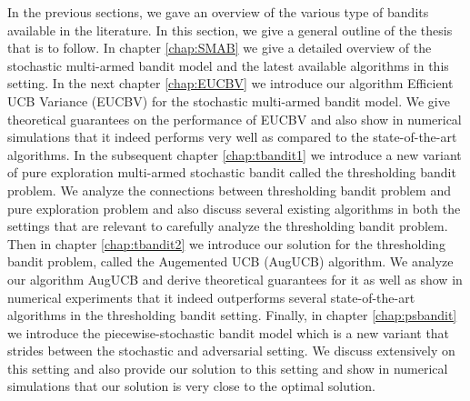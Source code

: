 In the previous sections, we gave an overview of the various type of bandits available in the literature. In this section, we give a general outline of the thesis that is to follow. In chapter \ref{chap:SMAB} we give a detailed overview of the stochastic multi-armed bandit model and the latest available algorithms in this setting. In the next chapter \ref{chap:EUCBV} we introduce our algorithm Efficient UCB Variance (EUCBV) for the stochastic multi-armed bandit model. We give theoretical guarantees on the performance of EUCBV and also show in numerical simulations that it indeed performs very well as compared to the state-of-the-art algorithms. In the subsequent chapter \ref{chap:tbandit1} we introduce a new variant of pure exploration multi-armed stochastic bandit called the thresholding bandit problem. We analyze the connections between thresholding bandit problem and pure exploration problem and also discuss several existing algorithms in both the settings that are relevant to carefully analyze the thresholding bandit problem. Then in chapter \ref{chap:tbandit2} we introduce our solution for the thresholding bandit problem, called the Augemented UCB (AugUCB) algorithm. We analyze our algorithm AugUCB and derive theoretical guarantees for it as well as show in numerical experiments that it indeed outperforms several state-of-the-art algorithms in the thresholding bandit setting. Finally, in chapter \ref{chap:psbandit} we introduce the piecewise-stochastic bandit model which is a new variant that strides between the stochastic and adversarial setting. We discuss extensively on this setting and also provide our solution to this setting and show in numerical simulations that our solution is very close to the optimal solution. 